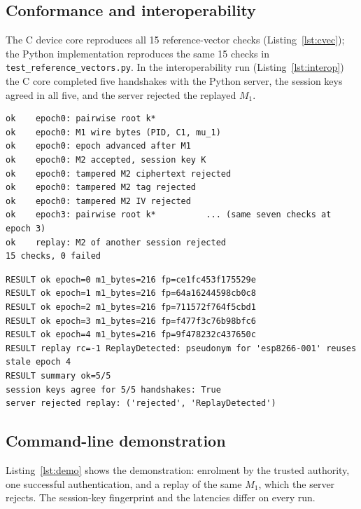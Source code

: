 \subsection*{Conformance and interoperability}
The C device core reproduces all 15 reference-vector checks (Listing~\ref{lst:cvec}); the Python implementation reproduces the same 15 checks in \texttt{test\_reference\_vectors.py}. In the interoperability run (Listing~\ref{lst:interop}) the C core completed five handshakes with the Python server, the session keys agreed in all five, and the server rejected the replayed $M_1$.

\par\noindent\begin{minipage}{\linewidth}
\begin{lstlisting}[style=terminal, caption={C device core against the reference vectors (\texttt{make -C implementation/c/host check}, abridged)}, label=lst:cvec]
ok    epoch0: pairwise root k*
ok    epoch0: M1 wire bytes (PID, C1, mu_1)
ok    epoch0: epoch advanced after M1
ok    epoch0: M2 accepted, session key K
ok    epoch0: tampered M2 ciphertext rejected
ok    epoch0: tampered M2 tag rejected
ok    epoch0: tampered M2 IV rejected
ok    epoch3: pairwise root k*          ... (same seven checks at epoch 3)
ok    replay: M2 of another session rejected
15 checks, 0 failed
\end{lstlisting}
\end{minipage}\par

\par\noindent\begin{minipage}{\linewidth}
\begin{lstlisting}[style=terminal, caption={C device core against the Python server (\texttt{python implementation/c/tools/interop.py -n 5})}, label=lst:interop]
RESULT ok epoch=0 m1_bytes=216 fp=ce1fc453f175529e
RESULT ok epoch=1 m1_bytes=216 fp=64a16244598cb0c8
RESULT ok epoch=2 m1_bytes=216 fp=711572f764f5cbd1
RESULT ok epoch=3 m1_bytes=216 fp=f477f3c76b98bfc6
RESULT ok epoch=4 m1_bytes=216 fp=9f478232c437650c
RESULT replay rc=-1 ReplayDetected: pseudonym for 'esp8266-001' reuses stale epoch 4
RESULT summary ok=5/5
session keys agree for 5/5 handshakes: True
server rejected replay: ('rejected', 'ReplayDetected')
\end{lstlisting}
\end{minipage}\par

\subsection*{Command-line demonstration}
Listing~\ref{lst:demo} shows the demonstration: enrolment by the trusted authority, one successful authentication, and a replay of the same $M_1$, which the server rejects. The session-key fingerprint and the latencies differ on every run.


